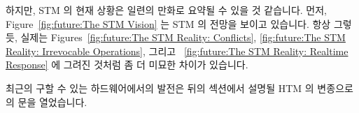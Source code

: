 하지만, STM 의 현재 상황은 일련의 만화로 요약될 수 있을 것 같습니다.
먼저,
Figure~\ref{fig:future:The STM Vision}
는 STM 의 전망을 보이고 있습니다.
항상 그렇듯, 실제는
Figures~\ref{fig:future:The STM Reality: Conflicts},
\ref{fig:future:The STM Reality: Irrevocable Operations},
그리고 ~\ref{fig:future:The STM Reality: Realtime Response}
에 그려진 것처럼 좀 더 미묘한 차이가 있습니다.

최근의 구할 수 있는 하드웨어에서의 발전은 뒤의 섹션에서 설명될 HTM 의
변종으로의 문을 열었습니다.

